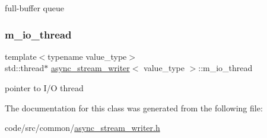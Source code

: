 full-\/buffer queue 

\mbox{\label{classasync__stream__writer_a4298b5c3a6950422907f0e59580386dd}} 
\subsubsection{\texorpdfstring{m\+\_\+io\+\_\+thread}{m\_io\_thread}}
{\footnotesize\ttfamily template$<$typename value\+\_\+type$>$ \\
std\+::thread$\ast$ \hyperlink{classasync__stream__writer}{async\+\_\+stream\+\_\+writer}$<$ value\+\_\+type $>$\+::m\+\_\+io\+\_\+thread\hspace{0.3cm}{\ttfamily [private]}}



pointer to I/O thread 



The documentation for this class was generated from the following file\+:\begin{DoxyCompactItemize}
\item 
code/src/common/\hyperlink{async__stream__writer_8h}{async\+\_\+stream\+\_\+writer.\+h}\end{DoxyCompactItemize}
